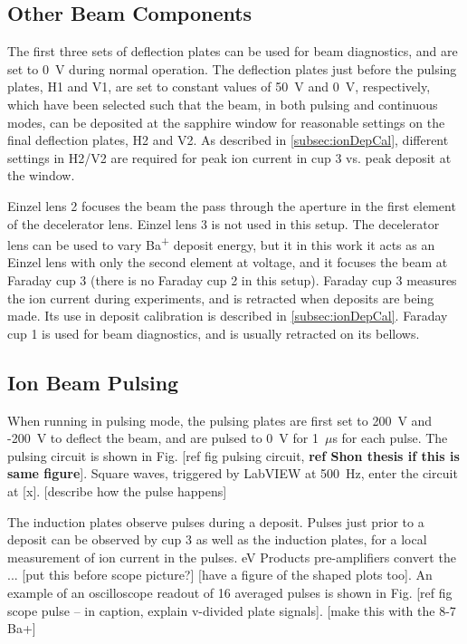 \subsection{Other Beam Components}

The first three sets of deflection plates can be used for beam diagnostics, and are set to 0~V during normal operation.  The deflection plates just before the pulsing plates, H1 and V1, are set to constant values of 50~V and 0~V, respectively, which have been selected such that the beam, in both pulsing and continuous modes, can be deposited at the sapphire window for reasonable settings on the final deflection plates, H2 and V2.  As described in \ref{subsec:ionDepCal}, different settings in H2/V2 are required for peak ion current in cup 3 vs. peak deposit at the window.

Einzel lens 2 focuses the beam the pass through the aperture in the first element of the decelerator lens.  Einzel lens 3 is not used in this setup.  The decelerator lens can be used to vary Ba\textsuperscript{+} deposit energy, but it in this work it acts as an Einzel lens with only the second element at voltage, and it focuses the beam at Faraday cup 3 (there is no Faraday cup 2 in this setup).  Faraday cup 3 measures the ion current during experiments, and is retracted when deposits are being made.  Its use in deposit calibration is described in \ref{subsec:ionDepCal}.  Faraday cup 1 is used for beam diagnostics, and is usually retracted on its bellows.  

\subsection{Ion Beam Pulsing}

When running in pulsing mode, the pulsing plates are first set to 200~V and -200~V to deflect the beam, and are pulsed to 0~V for 1~$\mu$s for each pulse.  The pulsing circuit is shown in Fig. [ref fig pulsing circuit, \textbf{ref Shon thesis if this is same figure}].  Square waves, triggered by LabVIEW at 500~Hz, enter the circuit at [x]. {\color{red}[describe how the pulse happens]}

The induction plates observe pulses during a deposit.  Pulses just prior to a deposit can be observed by cup 3 as well as the induction plates, for a local measurement of ion current in the pulses.  eV Products pre-amplifiers convert the ... [put this before scope picture?] [have a figure of the shaped plots too].  An example of an oscilloscope readout of {\color{red}16} averaged pulses is shown in Fig. [ref fig scope pulse -- in caption, explain v-divided plate signals].  [make this with the 8-7 Ba+]

